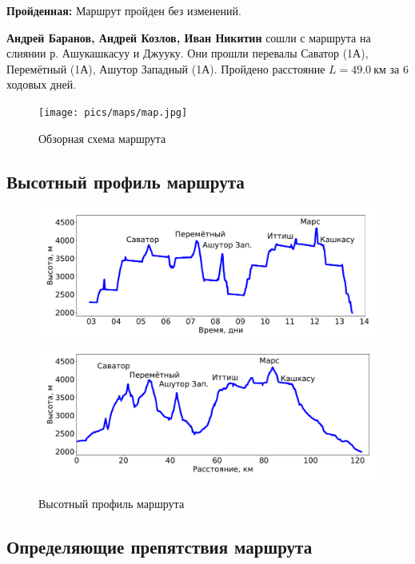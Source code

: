\textbf{Пройденная:} Маршрут пройден без изменений.

\textbf{Андрей Баранов, Андрей Козлов, Иван Никитин} сошли с маршрута на слиянии р. Ашукашкасуу и Джууку. Они прошли перевалы Саватор (1А), Перемётный (1А), Ашутор Западный (1А). Пройдено расстояние $L=49.0~\text{км}$ за 6 ходовых дней.

\begin{figure}[h!tbp]
	\centering
	\texttt{[image: pics/maps/map.jpg]}
	\caption{Обзорная схема маршрута}
\end{figure}

\newpage
\subsection{Высотный профиль маршрута}

\begin{figure}[h!]
	\centering
	\includegraphics[width=0.92\linewidth]{elevation_vs_time}
	\includegraphics[width=0.92\linewidth]{elevation_vs_distance}
	\caption{Высотный профиль маршрута}
	\label{fig:heights}
\end{figure}

\newpage
\subsection{Определяющие препятствия маршрута}

